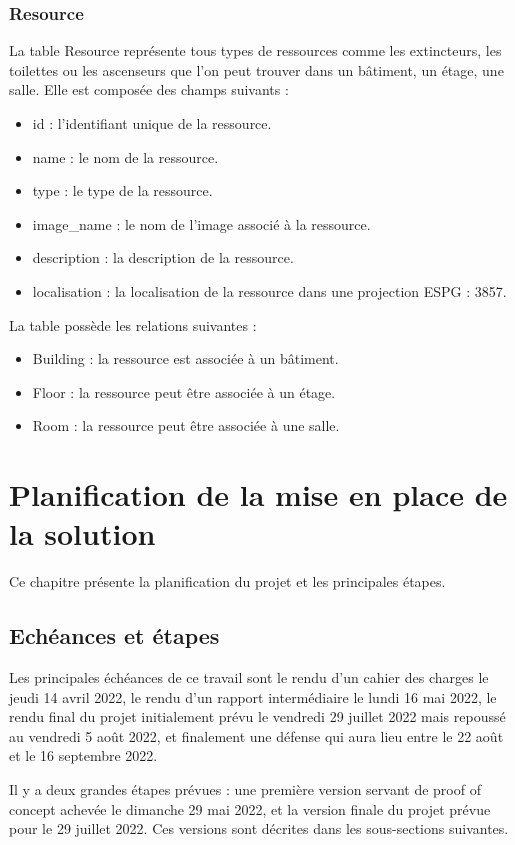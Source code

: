 \documentclass[
    iai, %
    il, %
]{heig-tb}
\begin{document}
\subsubsection{Resource}
La table Resource représente tous types de ressources comme les extincteurs, les toilettes ou les ascenseurs
que l'on peut trouver dans un bâtiment, un étage, une salle. Elle est composée des champs suivants :

\begin{itemize}
    \item id : l'identifiant unique de la ressource.
    \item name : le nom de la ressource.
    \item type : le type de la ressource.
    \item image\_name : le nom de l'image associé à la ressource.
    \item description : la description de la ressource.
    \item localisation : la localisation de la ressource dans une projection ESPG : 3857.
\end{itemize}

La table possède les relations suivantes :
\begin{itemize}
    \item Building : la ressource est associée à un bâtiment.
    \item Floor : la ressource peut être associée à un étage.
    \item Room : la ressource peut être associée à une salle.
\end{itemize}

\section{Planification de la mise en place de la solution}
Ce chapitre présente la planification du projet et les principales étapes.

\subsection{Echéances et étapes}
Les principales échéances de ce travail sont le rendu d'un cahier des charges le jeudi 14 avril 2022,
le rendu d'un rapport intermédiaire le lundi 16 mai 2022,
le rendu final du projet initialement prévu le vendredi 29 juillet 2022 mais repoussé au vendredi 5 août 2022, et
finalement une défense qui aura lieu entre le 22 août et le 16 septembre 2022.

Il y a deux grandes étapes prévues :
une première version servant de proof of concept achevée le dimanche 29 mai 2022,
et la version finale du projet prévue pour le 29 juillet 2022.
Ces versions sont décrites dans les sous-sections suivantes.
\end{document}
